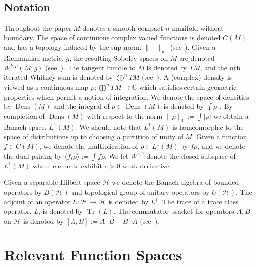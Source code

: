 \documentclass[final,leqno]{siamart}
\DeclareMathOperator{\Dens}{Dens}
\DeclareMathOperator{\Tr}{Tr}
\begin{document}
\subsection{Notation}
Throughout the paper $M$ denotes a smooth compact $n$-manifold without boundary. 
The space of continuous complex valued functions is denoted $C(M)$ and has a topology induced by the sup-norm, $\| \cdot \|_{\infty}$ (see~\cite{Taylor1974,Conway1990}).
Given a Riemannian metric, $g$, the resulting Sobolev spaces on $M$ are denoted $W^{k,p}(M ; g)$ (see~\cite{Hebey1999}).
The tangent bundle to $M$ is denoted by $TM$, and the $n$th iterated Whitney sum is denoted by $\bigoplus^{n} TM$ (see~\cite{Lee2006}).
A (complex) density is viewed as a continuous map $\rho: \bigoplus^{n}TM \to \mathbb{C}$ which satisfies certain geometric properties which permit a notion of integration.
We denote the space of densities by $\Dens(M)$ and the integral of $\rho \in \Dens(M)$ is denoted by $\int \rho$~\cite[Chapter 16]{Lee2006}.
By completion of $\Dens(M)$ with respect to the norm $\| \rho \|_{1} := \int | \rho|$ we obtain a Banach space, $L^{1}(M)$.
We should note that $L^1(M)$ is homeomorphic to the space of distributions up to choosing a partition of unity of $M$.
Given a function $f \in C(M)$, we denote the multiplication of $\rho \in L^{1}(M)$ by $f \rho$, and we denote the dual-pairing by $\langle f , \rho \rangle := \int f \rho$.
We let $W^{s,1}$ denote the closed subspace of $L^{1}(M)$ whose elements exhibit $s>0$ weak derivative.

Given a separable Hilbert space $\mathcal{H}$ we denote the Banach-algebra of bounded operators by $B( \mathcal{H})$ and topological group of unitary operators by $U( \mathcal{H})$.
The adjoint of an operator $L : \mathcal{H} \to \mathcal{H}$ is denoted by $L^{\dagger}$.
The trace of a trace class operator, $L$, is denoted by $\Tr(L)$.
The commutator bracket for operators $A,B$ on $\mathcal{H}$ is denoted by $[A,B] := A \cdot B - B \cdot A$ (see~\cite{Conway1990}).



\section{Relevant Function Spaces}
\label{sec:half densities}
\end{document}
